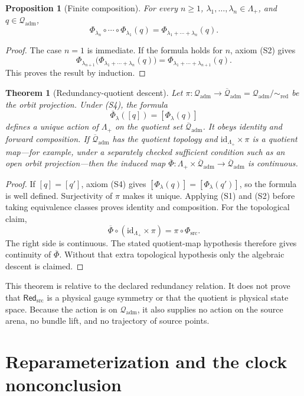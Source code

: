 \documentclass[11pt]{article}
\newcommand{\Qadm}{\mathcal Q_{\mathrm{adm}}}
\newcommand{\Red}{\mathsf{Red}_{\mathrm{src}}}
\newcommand{\PhiSrc}{\Phi_{\mathrm{src}}}
\newcommand{\Lam}{\Lambda_+}
\newcommand{\Qbar}{\overline{\mathcal Q}_{\mathrm{adm}}}
\newtheorem{theorem}{Theorem}
\newtheorem{proposition}{Proposition}
\begin{document}
\begin{proposition}[Finite composition]
For every \(n\geq1\), \(\lambda_1,\ldots,\lambda_n\in\Lam\), and
\(q\in\Qadm\),
\[
  \Phi_{\lambda_n}\circ\cdots\circ\Phi_{\lambda_1}(q)
  =
  \Phi_{\lambda_1+\cdots+\lambda_n}(q).
\]
\end{proposition}

\begin{proof}
The case \(n=1\) is immediate. If the formula holds for \(n\), axiom (S2)
gives
\[
 \Phi_{\lambda_{n+1}}
 \bigl(\Phi_{\lambda_1+\cdots+\lambda_n}(q)\bigr)
 =
 \Phi_{\lambda_1+\cdots+\lambda_{n+1}}(q).
\]
This proves the result by induction.
\end{proof}

\begin{theorem}[Redundancy-quotient descent]
Let \(\pi:\Qadm\to\Qbar=\Qadm/{\sim_{\mathrm{red}}}\) be the orbit projection.
Under (S4), the formula
\[
  \overline\Phi_\lambda([q])
  =
  [\Phi_\lambda(q)]
\]
defines a unique action of \(\Lam\) on the quotient set \(\Qbar\). It obeys
identity and forward composition. If \(\Qbar\) has the quotient topology and
\(\mathrm{id}_{\Lam}\times\pi\) is a quotient map---for example, under a
separately checked sufficient condition such as an open orbit
projection---then the induced map
\(\overline\Phi:\Lam\times\Qbar\to\Qbar\) is continuous.
\end{theorem}

\begin{proof}
If \([q]=[q']\), axiom (S4) gives
\([\Phi_\lambda(q)]=[\Phi_\lambda(q')]\), so the formula is well defined.
Surjectivity of \(\pi\) makes it unique. Applying (S1) and (S2) before taking
equivalence classes proves identity and composition. For the topological
claim,
\[
 \overline\Phi\circ(\mathrm{id}_{\Lam}\times\pi)
 =
 \pi\circ\PhiSrc .
\]
The right side is continuous. The stated quotient-map hypothesis therefore
gives continuity of \(\overline\Phi\). Without that extra topological
hypothesis only the algebraic descent is claimed.
\end{proof}

This theorem is relative to the declared redundancy relation. It does not
prove that \(\Red\) is a physical gauge symmetry or that the quotient is
physical state space. Because the action is on \(\Qadm\), it also supplies no
action on the source arena, no bundle lift, and no trajectory of source
points.

\section{Reparameterization and the clock nonconclusion}
\end{document}
